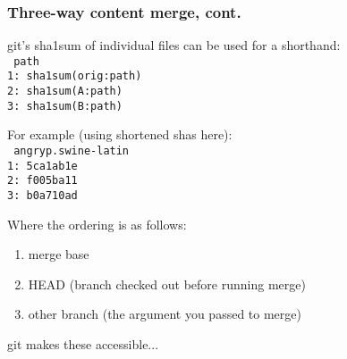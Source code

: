 \documentclass[t]{beamer}
\begin{document}
\begin{frame}
{    
  }

\end{frame}


\begin{frame}
  \frametitle{Three-way content merge, cont.}

  git's sha1sum of individual files can be used for a shorthand:\\
    {\footnotesize\texttt{%
    \hspace*{0.6em} path\\
    1:\ sha1sum(orig:path)\\
    2:\ sha1sum(A:path)\\
    3:\ sha1sum(B:path)\\[\baselineskip]
    }}

  \pause

  For example (using shortened shas here):\\
    {\footnotesize\texttt{%
    \hspace*{0.6em} angryp.swine-latin\\
    1:\ 5ca1ab1e\\
    2:\ f005ba11\\
    3:\ b0a710ad\\[\baselineskip]
    }}

  \pause

  Where the ordering is as follows:
  {\footnotesize
  \begin{enumerate}
    \item merge base
    \item HEAD (branch checked out before running merge)
    \item other branch (the argument you passed to merge)
  \end{enumerate}
  }

  \pause

  \vspace*{0.5\baselineskip}
  git makes these accessible...

\end{frame}
\end{document}
